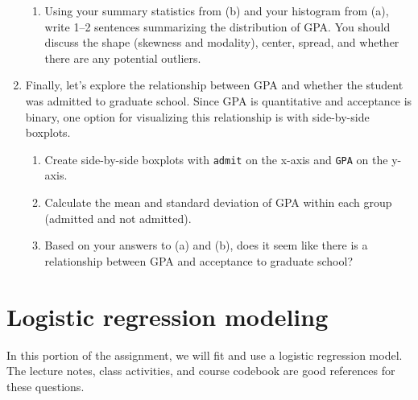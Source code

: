 \documentclass[11pt]{article}
\begin{document}
\begin{enumerate}
\begin{enumerate}
\item Using your summary statistics from (b) and your histogram from (a), write 1--2 sentences summarizing the distribution of GPA. You should discuss the shape (skewness and modality), center, spread, and whether there are any potential outliers.
\end{enumerate}

\item Finally, let's explore the relationship between GPA and whether the student was admitted to graduate school. Since GPA is quantitative and acceptance is binary, one option for visualizing this relationship is with side-by-side boxplots.

\begin{enumerate}
\item Create side-by-side boxplots with \verb;admit; on the x-axis and \verb;GPA; on the y-axis. 

\item Calculate the mean and standard deviation of GPA within each group (admitted and not admitted).

\item Based on your answers to (a) and (b), does it seem like there is a relationship between GPA and acceptance to graduate school?
\end{enumerate}

\end{enumerate}

\newpage

\section{Logistic regression modeling}

In this portion of the assignment, we will fit and use a logistic regression model. The lecture notes, class activities, and course codebook are good references for these questions.
\end{document}
